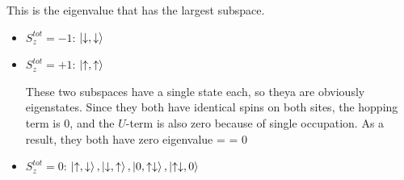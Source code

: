 \documentclass[12pt]{article}
\begin{document}
This is the eigenvalue that has the largest subspace.
\begin{itemize}
\item \(S_z^{tot} = -1\): \(\ket{\downarrow,\downarrow}\)
\item \(S_z^{tot} = +1\): \(\ket{\uparrow,\uparrow}\)

These two subspaces have a single state each, so theya are obviously eigenstates. Since they both have identical spins on both sites, the hopping term is 0, and the \(U\)-term is also zero because of single occupation. As a result, they both have zero eigenvalue
\beq
\ham \ket{\downarrow,\downarrow} = \ham \ket{\uparrow,\uparrow} = 0
\eeq

\item \(S_z^{tot} = 0\):  \(\ket{\uparrow,\downarrow},\ket{\downarrow,\uparrow},\ket{0,\uparrow\downarrow},\ket{\uparrow\downarrow,0}\)


\end{itemize}
\end{document}
